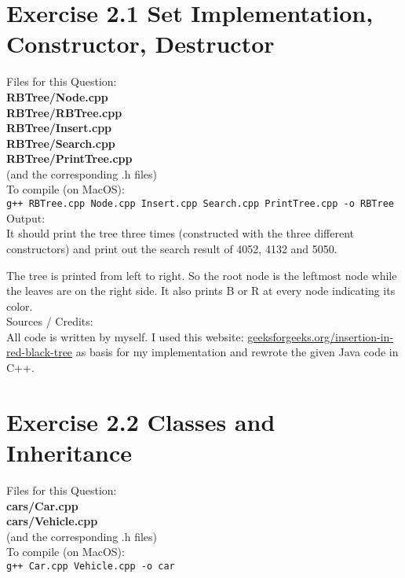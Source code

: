 \documentclass{article} %
\newcommand{\homeworkNumber}{2} %
\begin{document}
\section*{Exercise \homeworkNumber.1 Set Implementation, Constructor, Destructor}
Files for this Question:\\
\textbf{RBTree/Node.cpp}\\
\textbf{RBTree/RBTree.cpp}\\
\textbf{RBTree/Insert.cpp}\\
\textbf{RBTree/Search.cpp}\\
\textbf{RBTree/PrintTree.cpp}\\
(and the corresponding .h files)\\

To compile (on MacOS):\\
\verb|g++ RBTree.cpp Node.cpp Insert.cpp Search.cpp PrintTree.cpp -o RBTree|\\

Output:\\
It should print the tree three times (constructed with the three different constructors) and print out the search result of 4052, 4132 and 5050.

The tree is printed from left to right. So the root node is the leftmost node while the leaves are on the right side. It also prints B or R at every node indicating its color.\\

Sources / Credits:\\
All code is written by myself. I used this website: 
\href{https://www.geeksforgeeks.org/insertion-in-red-black-tree/}{geeksforgeeks.org/insertion-in-red-black-tree}
as basis for my implementation and rewrote the given Java code in C++.
\clearpage


\section*{Exercise \homeworkNumber.2 Classes and Inheritance}
Files for this Question:\\
\textbf{cars/Car.cpp}\\
\textbf{cars/Vehicle.cpp}\\
(and the corresponding .h files)\\

To compile (on MacOS):\\
\verb|g++ Car.cpp Vehicle.cpp -o car|\\
\end{document}
